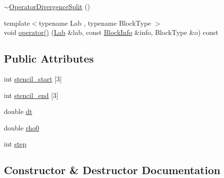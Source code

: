 \begin{DoxyCompactItemize}
\item 
\hyperlink{struct_operator_divergence_split_aef8591e337b33be83bdc01745cb0cb07}{$\sim$\+Operator\+Divergence\+Split} ()
\item 
{\footnotesize template$<$typename Lab , typename Block\+Type $>$ }\\void \hyperlink{struct_operator_divergence_split_a256c5da74a074e563b36bb2a62b2c2f9}{operator()} (\hyperlink{_definitions_8h_ad6f951af9a2a6ebc1975404882b34314}{Lab} \&lab, const \hyperlink{struct_block_info}{Block\+Info} \&info, Block\+Type \&o) const 
\end{DoxyCompactItemize}
\subsection*{Public Attributes}
\begin{DoxyCompactItemize}
\item 
int \hyperlink{struct_operator_divergence_split_a14fbd9270473cbd1915523b7b9dec057}{stencil\+\_\+start} \mbox{[}3\mbox{]}
\item 
int \hyperlink{struct_operator_divergence_split_a174562235d758ddfc898dd89f6bf4f8b}{stencil\+\_\+end} \mbox{[}3\mbox{]}
\item 
double \hyperlink{struct_operator_divergence_split_a9749e394edfddc02d599711bb6b727b1}{dt}
\item 
double \hyperlink{struct_operator_divergence_split_aa328435749c668cea1f697624d47c815}{rho0}
\item 
int \hyperlink{struct_operator_divergence_split_add46415c643d7ba724e43bbd13628669}{step}
\end{DoxyCompactItemize}


\subsection{Constructor \& Destructor Documentation}
\hypertarget{struct_operator_divergence_split_a1e587e11e410c9a9d12b591f94149c72}{}
